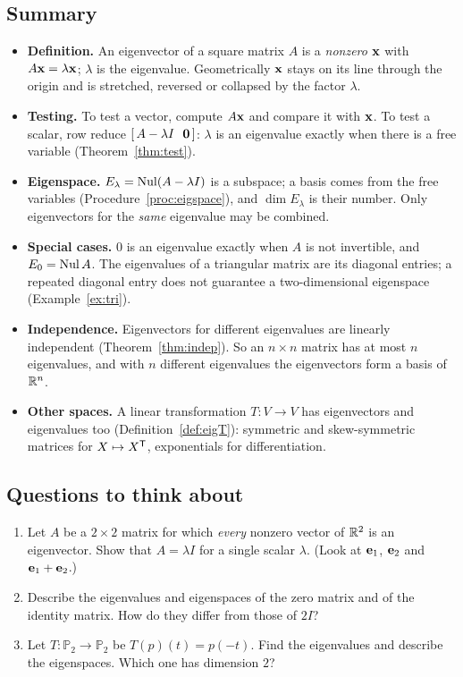 \documentclass[11pt]{article}
\begin{document}
\subsection*{Summary}
\begin{itemize}
  \item \textbf{Definition.} An eigenvector of a square matrix $A$ is a \emph{nonzero} $\mathbf{x}$ with $A\mathbf{x}=\lambda\mathbf{x}$; $\lambda$ is the eigenvalue. Geometrically $\mathbf{x}$ stays on its line through the origin and is stretched, reversed or collapsed by the factor $\lambda$.
  \item \textbf{Testing.} To test a vector, compute $A\mathbf{x}$ and compare it with $\mathbf{x}$. To test a scalar, row reduce $[\,A-\lambda I\ \ \mathbf{0}\,]$: $\lambda$ is an eigenvalue exactly when there is a free variable (Theorem~\ref{thm:test}).
  \item \textbf{Eigenspace.} $E_\lambda=\operatorname{Nul}(A-\lambda I)$ is a subspace; a basis comes from the free variables (Procedure~\ref{proc:eigspace}), and $\dim E_\lambda$ is their number. Only eigenvectors for the \emph{same} eigenvalue may be combined.
  \item \textbf{Special cases.} $0$ is an eigenvalue exactly when $A$ is not invertible, and $E_0=\operatorname{Nul} A$. The eigenvalues of a triangular matrix are its diagonal entries; a repeated diagonal entry does not guarantee a two-dimensional eigenspace (Example~\ref{ex:tri}).
  \item \textbf{Independence.} Eigenvectors for different eigenvalues are linearly independent (Theorem~\ref{thm:indep}). So an $n\times n$ matrix has at most $n$ eigenvalues, and with $n$ different eigenvalues the eigenvectors form a basis of $\mathbb{R}^n$.
  \item \textbf{Other spaces.} A linear transformation $T:V\to V$ has eigenvectors and eigenvalues too (Definition~\ref{def:eigT}): symmetric and skew-symmetric matrices for $X\mapsto X^{\mathsf T}$, exponentials for differentiation.
\end{itemize}

\subsection*{Questions to think about}
\begin{enumerate}
  \item Let $A$ be a $2\times2$ matrix for which \emph{every} nonzero vector of $\mathbb{R}^2$ is an eigenvector. Show that $A=\lambda I$ for a single scalar $\lambda$. (Look at $\mathbf{e}_1$, $\mathbf{e}_2$ and $\mathbf{e}_1+\mathbf{e}_2$.)
  \item Describe the eigenvalues and eigenspaces of the zero matrix and of the identity matrix. How do they differ from those of $2I$?
  \item Let $T:\mathbb{P}_2\to\mathbb{P}_2$ be $T(p)(t)=p(-t)$. Find the eigenvalues and describe the eigenspaces. Which one has dimension $2$?
\end{enumerate}
\end{document}
